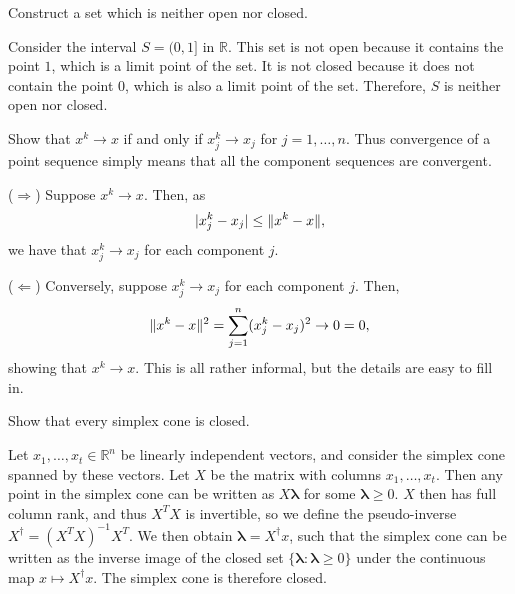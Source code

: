 \begin{exercise}
  Construct a set which is neither open nor closed.
\end{exercise}

\begin{solution}
  Consider the interval $S = (0, 1]$ in $\mathbb{R}$.
  This set is not open because it contains the point $1$, which is a limit point of the set.
  It is not closed because it does not contain the point $0$, which is also a limit point of the set.
  Therefore, $S$ is neither open nor closed.
\end{solution}

\begin{exercise}
  Show that $x^k \to x$ if and only if $x_j^k \to x_j$ for $j = 1, \ldots, n$.
  Thus convergence of a point sequence simply means that all the component sequences are convergent.
\end{exercise}

\begin{solution}
  ($\Rightarrow$) Suppose $x^k \to x$.
  Then, as
  \begin{equation}
    \lvert x_j^k - x_j\rvert \leq \lVert x^k - x\rVert,
  \end{equation}
  we have that $x_j^k \to x_j$ for each component $j$.

  ($\Leftarrow$) Conversely, suppose $x_j^k \to x_j$ for each component $j$.
  Then,
  \begin{equation}
    \lVert x^k - x\rVert^2 = \sum_{j = 1}^{n} (x_j^k - x_j)^2 \to 0 = 0,
  \end{equation}
  showing that $x^k \to x$.
  This is all rather informal, but the details are easy to fill in.
\end{solution}

\begin{exercise}
  Show that every simplex cone is closed.
\end{exercise}

\begin{solution}
  Let $x_1, \ldots, x_t \in \mathbb{R}^n$ be linearly independent vectors, and consider the simplex cone spanned by these vectors.
  Let $X$ be the matrix with columns $x_1, \ldots, x_t$.
  Then any point in the simplex cone can be written as $X \boldsymbol{\lambda}$ for some $\boldsymbol{\lambda} \geq 0$.
  $X$ then has full column rank, and thus $X^T X$ is invertible, so we define the pseudo-inverse $X^\dagger = (X^T X)^{-1} X^T$.
  We then obtain $\boldsymbol{\lambda} = X^\dagger x$, such that the simplex cone can be written as the inverse image of the closed set $\{ \boldsymbol{\lambda} : \boldsymbol{\lambda} \geq 0 \}$ under the continuous map $x \mapsto X^\dagger x$.
  The simplex cone is therefore closed.
\end{solution}

